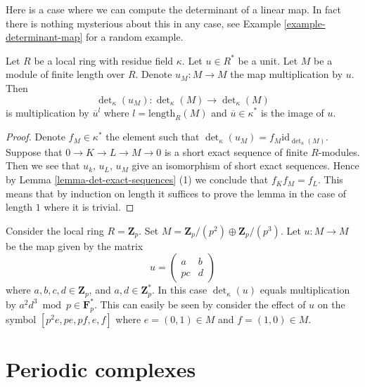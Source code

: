 \noindent
Here is a case where we can compute the determinant of a linear map.
In fact there is nothing mysterious about this in any case, see
Example \ref{example-determinant-map} for a random example.

\begin{lemma}
\label{lemma-times-u-determinant}
Let $R$ be a local ring with residue field $\kappa$.
Let $u \in R^*$ be a unit.
Let $M$ be a module of finite length over $R$.
Denote $u_M : M \to M$ the map multiplication by $u$.
Then
$$
\det\nolimits_\kappa(u_M) :
\det\nolimits_\kappa(M)
\longrightarrow
\det\nolimits_\kappa(M)
$$
is multiplication by $\overline{u}^l$ where $l = \text{length}_R(M)$
and $\overline{u} \in \kappa^*$ is the image of $u$.
\end{lemma}

\begin{proof}
Denote $f_M \in \kappa^*$ the element such that
$\det\nolimits_\kappa(u_M) = f_M \text{id}_{\det\nolimits_\kappa(M)}$.
Suppose that $0 \to K \to L \to M \to 0$ is a short
exact sequence of finite $R$-modules. Then we see that
$u_k$, $u_L$, $u_M$ give an isomorphism of short exact sequences.
Hence by Lemma \ref{lemma-det-exact-sequences} (1) we conclude that
$f_K f_M = f_L$.
This means that by induction on length it suffices to prove the
lemma in the case of length $1$ where it is trivial.
\end{proof}

\begin{example}
\label{example-determinant-map}
Consider the local ring $R = \mathbf{Z}_p$.
Set $M = \mathbf{Z}_p/(p^2) \oplus \mathbf{Z}_p/(p^3)$.
Let $u : M \to M$ be the map given by the matrix
$$
u =
\left(
\begin{matrix}
a & b \\
pc & d
\end{matrix}
\right)
$$
where $a, b, c, d \in \mathbf{Z}_p$, and $a, d \in \mathbf{Z}_p^*$.
In this case $\det_\kappa(u)$ equals multiplication by
$a^2d^3 \bmod p \in \mathbf{F}_p^*$. This can easily be seen
by consider the effect of $u$ on the symbol
$[p^2e, pe, pf, e, f]$ where $e = (0 , 1) \in M$ and
$f = (1, 0) \in M$.
\end{example}








\section{Periodic complexes}
\label{section-periodic-complexes}

